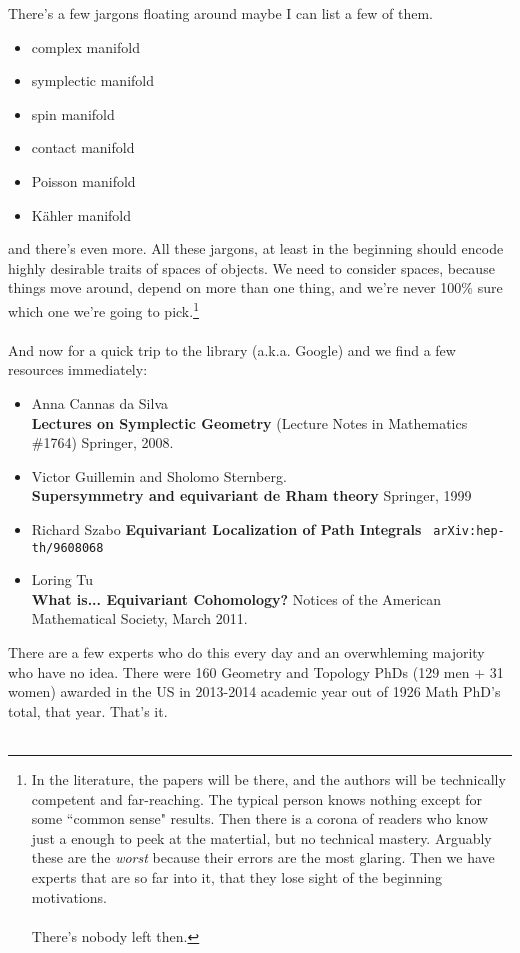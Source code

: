 \documentclass[12pt]{article}
\begin{document}
\noindent There's a few jargons floating around maybe I can list a few of them.
\begin{itemize}
\item complex manifold
\item symplectic manifold
\item spin manifold
\item contact manifold
\item Poisson manifold
\item K\"{a}hler manifold
\end{itemize}
and there's even more.  All these jargons, at least in the beginning should encode highly desirable traits of spaces of objects.  We need to consider spaces, because things move around, depend on more than one thing, and we're never 100\% sure which one we're going to pick.\footnote{
In the literature, the papers will be there, and the authors will be technically competent and far-reaching.  The typical person knows nothing except for some ``common sense" results.  Then there is a corona of readers who know just a enough to peek at the matertial, but no technical mastery.  Arguably these are the \textit{worst} because their errors are the most glaring. Then we have experts that are so far into it, that they lose sight of the beginning motivations.  \\ \\
There's nobody left then.} \\ \\
And now for a quick trip to the library (a.k.a. Google) and we find a few resources immediately:
\begin{itemize}
\item Anna Cannas da Silva \\ \textbf{Lectures on Symplectic Geometry}  (Lecture Notes in Mathematics \#1764) Springer, 2008.
\item Victor Guillemin and Sholomo Sternberg. \\
\textbf{Supersymmetry and equivariant de Rham theory} Springer, 1999
\item Richard Szabo \textbf{Equivariant Localization of Path Integrals} \texttt{ arXiv:hep-th/9608068}
\item Loring Tu \\ \textbf{What is... Equivariant Cohomology?} Notices of the American Mathematical Society, March 2011.
\end{itemize}
There are a few experts who do this every day and an overwhleming majority who have no idea.  There were 160 Geometry and Topology PhDs (129 men + 31 women) awarded in the US in 2013-2014 academic year out of 1926 Math PhD's total, that year.  That's it. \\ \\
\end{document}

